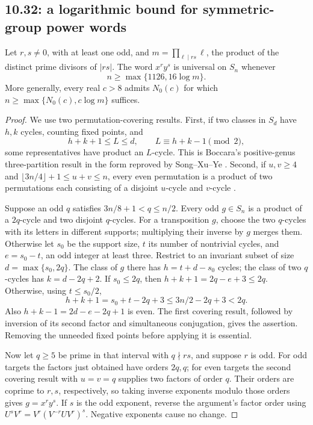 \subsection{10.32: a logarithmic bound for symmetric-group power words}
\label{cand:10.32}
\begin{proposition}
Let \(r,s\ne0\), with at least one odd, and
\(m=\prod_{\ell\mid rs}\ell\), the product of the distinct prime divisors
of \(|rs|\). The word \(x^ry^s\) is universal on \(S_n\) whenever
\[
 n\ge\max\{1126,16\log m\}.
\]
More generally, every real \(c>8\) admits \(N_0(c)\) for which
\(n\ge\max\{N_0(c),c\log m\}\) suffices.
\end{proposition}
\begin{proof}
We use two permutation-covering results. First, if two classes in
\(S_d\) have \(h,k\) cycles, counting fixed points, and
\[
 h+k+1\le L\le d,\qquad L\equiv h+k-1\pmod2,
\]
some representatives have product an \(L\)-cycle.
This is Boccara's positive-genus three-partition result in the form
reproved by Song--Xu--Ye \cite[Propositions~1.4 and~2.1]{song-xu-ye}.
Second, if \(u,v\ge4\) and
\(\lfloor3n/4\rfloor+1\le u+v\le n\), every even permutation is
a product of two permutations each consisting of a disjoint
\(u\)-cycle and \(v\)-cycle \cite[Lemma~5]{brenner-evans-silberger}.

Suppose an odd \(q\) satisfies \(3n/8+1<q\le n/2\).
Every odd \(g\in S_n\) is a product of a \(2q\)-cycle and two disjoint
\(q\)-cycles. For a transposition \(g\), choose the two \(q\)-cycles
with its letters in different supports; multiplying their inverse
by \(g\) merges them.
Otherwise let \(s_0\) be the support size, \(t\) its number of nontrivial
cycles, and \(e=s_0-t\), an odd integer at least three.
Restrict to an invariant subset of size \(d=\max\{s_0,2q\}\).
The class of \(g\) there has \(h=t+d-s_0\) cycles; the class of two
\(q\)-cycles has \(k=d-2q+2\).
If \(s_0\le2q\), then \(h+k+1=2q-e+3\le2q\).
Otherwise, using \(t\le s_0/2\),
\[
 h+k+1=s_0+t-2q+3\le3n/2-2q+3<2q.
\]
Also \(h+k-1=2d-e-2q+1\) is even.
The first covering result, followed by inversion of its second factor
and simultaneous conjugation, gives the assertion. Removing the
unneeded fixed points before applying it is essential.

Now let \(q\ge5\) be prime in that interval with \(q\nmid rs\), and
suppose \(r\) is odd. For odd targets the factors just obtained have
orders \(2q,q\); for even targets the second covering result with
\(u=v=q\) supplies two factors of order \(q\).
Their orders are coprime to \(r,s\), respectively, so taking inverse
exponents modulo those orders gives \(g=x^ry^s\).
If \(s\) is the odd exponent, reverse the argument's factor order
using \(U^sV^r=V^r(V^{-r}UV^r)^s\).
Negative exponents cause no change.


\end{proof}
